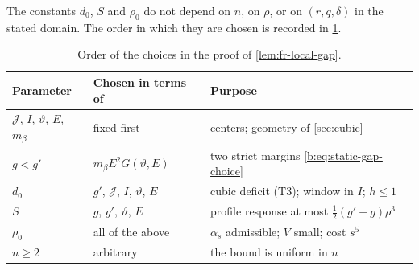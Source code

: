 The constants $d_0$, $S$ and $\rho_0$ do not depend on $n$, on $\rho$, or on $(r,q,\delta)$ in the stated domain. The order in which they are chosen is recorded in \cref{tab:fr-choices}.

\begin{table}[ht]
\centering
\begin{tabular}{@{}lll@{}}
\toprule
Parameter & Chosen in terms of & Purpose\\
\midrule
$\mathcal J$, $I$, $\vartheta$, $E$, $m_\beta$ & fixed first & centers; geometry of \cref{sec:cubic}\\
$g<g'$ & $m_\beta E^2G(\vartheta,E)$ & two strict margins \eqref{b:eq:static-gap-choice}\\
$d_0$ & $g'$, $\mathcal J$, $I$, $\vartheta$, $E$ & cubic deficit (T3); window in $I$; $h\le1$\\
$S$ & $g$, $g'$, $\vartheta$, $E$ & profile response at most $\frac12(g'-g)\rho^3$\\
$\rho_0$ & all of the above & $\alpha_s$ admissible; $V$ small; cost $s^5$\\
$n\ge2$ & arbitrary & the bound is uniform in $n$\\
\bottomrule
\end{tabular}
\caption{Order of the choices in the proof of \cref{lem:fr-local-gap}.}\label{tab:fr-choices}
\end{table}

